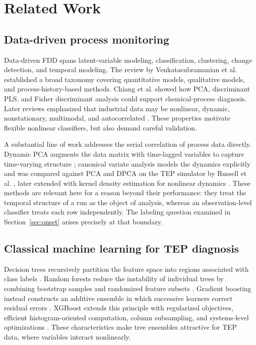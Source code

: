 \documentclass[10pt,twocolumn,a4paper]{article}
\begin{document}
\section{Related Work}

\subsection{Data-driven process monitoring}

Data-driven FDD spans latent-variable modeling, classification, clustering,
change detection, and temporal modeling. The review by Venkatasubramanian et
al. \cite{venkatasubramanian2003review} established a broad taxonomy covering
quantitative models, qualitative models, and process-history-based methods.
Chiang et al. \cite{chiang2000discriminant,chiang2001book} showed how PCA,
discriminant PLS, and Fisher discriminant analysis could support chemical-process
diagnosis. Later reviews emphasized that industrial data may be nonlinear,
dynamic, nonstationary, multimodal, and autocorrelated
\cite{yin2014review,ji2022review}. These properties motivate flexible nonlinear
classifiers, but also demand careful validation.

A substantial line of work addresses the serial correlation of process data
directly. Dynamic PCA augments the data matrix with time-lagged variables to
capture time-varying structure \cite{ku1995dpca}; canonical variate analysis
models the dynamics explicitly and was compared against PCA and DPCA on the TEP
simulator by Russell et al. \cite{russell2000cva}, later extended with kernel
density estimation for nonlinear dynamics \cite{odiowei2010cva}. These methods
are relevant here for a reason beyond their performance: they treat the
temporal structure of a run as the object of analysis, whereas an
observation-level classifier treats each row independently. The labeling
question examined in Section~\ref{sec:onset} arises precisely at that
boundary.

\subsection{Classical machine learning for TEP diagnosis}

Decision trees recursively partition the feature space into regions associated
with class labels \cite{breiman1984cart}. Random forests reduce the instability
of individual trees by combining bootstrap samples and randomized feature
subsets \cite{breiman2001rf}. Gradient boosting instead constructs an additive
ensemble in which successive learners correct residual errors
\cite{friedman2001gbm}. XGBoost extends this principle with regularized
objectives, efficient histogram-oriented computation, column subsampling, and
systems-level optimizations \cite{chen2016xgboost}. These characteristics make
tree ensembles attractive for TEP data, where variables interact nonlinearly.
\end{document}
